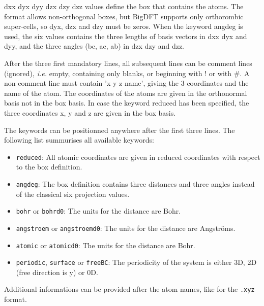 \documentclass[a4paper,11pt]{report}
\begin{document}
dxx dyx dyy dzx dzy dzz values define the box that contains the atoms. The format allows non-orthogonal boxes, but BigDFT supports only orthorombic super-cells, so dyx, dzx and dzy must be zeros. When the keyword angdeg is used, the six values contains the three lengths of basis vectors in dxx dyx and dyy, and the three angles (bc, ac, ab) in dzx dzy and dzz.

After the three first mandatory lines, all subsequent lines can be comment lines (ignored), \textit{i.e.} empty, containing only blanks, or beginning with ! or with \#. A non comment line must contain 'x y z name', giving the 3 coordinates and the name of the atom. The coordinates of the atoms are given in the orthonormal basis not in the box basis. In case the keyword reduced has been specified, the three coordinates x, y and z are given in the box basis.

The keywords can be positionned anywhere after the first three lines. The following list summurises all available keywords:
\begin{itemize}
  \item \texttt{reduced}: All atomic coordinates are given in reduced coordinates with respect to the box definition.
  \item \texttt{angdeg}: The box definition contains three distances and three angles instead of the classical six projection values.
  \item \texttt{bohr} or \texttt{bohrd0}: The units for the distance are Bohr.
  \item \texttt{angstroem} or \texttt{angstroemd0}: The units for the distance are Angströms.
  \item \texttt{atomic} or \texttt{atomicd0}: The units for the distance are Bohr.
  \item \texttt{periodic}, \texttt{surface} or \texttt{freeBC}: The periodicity of the system is either 3D, 2D (free direction is y) or 0D.
\end{itemize}

Additional informations can be provided after the atom names, like for the \texttt{.xyz} format.

\end{document}
